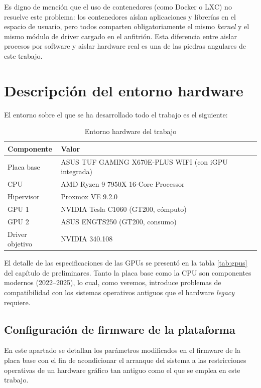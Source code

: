 Es digno de mención que el uso de contenedores (como Docker o LXC) no resuelve este problema: 
los contenedores aíslan aplicaciones y librerías en el espacio de usuario, pero todos comparten 
obligatoriamente el mismo \textit{kernel} y el mismo módulo de driver cargado en el anfitrión. 
Esta diferencia entre aislar procesos por software y aislar hardware real es una de las piedras
angulares de este trabajo.

\section{Descripción del entorno hardware}

El entorno sobre el que se ha desarrollado todo el trabajo es el siguiente:

\begin{table}[htbp]
\centering
\begin{tabular}{|l|l|}
\hline
\textbf{Componente} & \textbf{Valor} \\
\hline
Placa base & ASUS TUF GAMING X670E-PLUS WIFI                             (con iGPU integrada)\\
\hline
CPU & AMD Ryzen 9 7950X 16-Core Processor\\
\hline
Hipervisor & Proxmox VE 9.2.0 \\
\hline
GPU 1 & NVIDIA Tesla C1060 (GT200, cómputo) \\
\hline
GPU 2 & ASUS ENGTS250 (GT200, consumo) \\
\hline
Driver objetivo & NVIDIA 340.108 \\
\hline
\end{tabular}
\caption{Entorno hardware del trabajo}
\label{tab:entorno}
\end{table}

El detalle de las especificaciones de las GPUs se presentó en la tabla \ref{tab:gpus} del capítulo de preliminares. Tanto la placa base como la CPU son componentes modernos (2022--2025), lo cual, como veremos, introduce problemas de compatibilidad con los sistemas operativos antiguos que el hardware \textit{legacy} requiere.

\subsection{Configuración de firmware de la plataforma}

En este apartado se detallan los parámetros modificados en el firmware de la placa base 
con el fin de acondicionar el arranque del sistema a las restricciones operativas de un 
hardware gráfico tan antiguo como el que se emplea en este trabajo.

